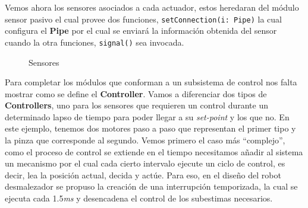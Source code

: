 Vemos ahora los sensores asociados a cada actuador, estos heredaran del módulo sensor pasivo el cual provee dos funciones, \verb|setConnection(i: Pipe)| la cual configura el \textbf{Pipe} por el cual se enviará la información obtenida del sensor cuando la otra funciones, \verb|signal()| sea invocada.

\begin{figure}[h]
\caption{Sensores}
\begin{center}
\end{center}
\end{figure}

Para completar los módulos que conforman a un subsistema de control nos falta mostrar como se define el \textbf{Controller}. Vamos a diferenciar dos tipos de \textbf{Controllers}, uno para los sensores que requieren un control durante un determinado lapso de tiempo para poder llegar a su \textit{set-point} y los que no. En este ejemplo, tenemos dos motores paso a paso que representan el primer tipo y la pinza que corresponde al segundo. Vemos primero el caso más ``complejo'', como el proceso de control se extiende en el tiempo necesitamos añadir al sistema un mecanismo por el cual cada cierto intervalo ejecute un ciclo de control, es decir, lea la posición actual, decida y actúe. Para eso, en el diseño del robot desmalezador se propuso la creación de una interrupción temporizada, la cual se ejecuta cada 1.5\textit{ms} y desencadena el control de los subestimas necesarios.


